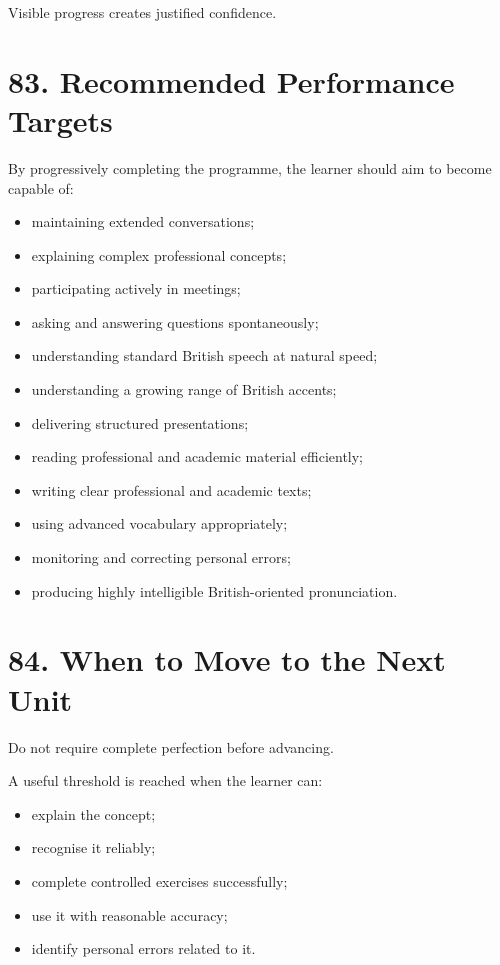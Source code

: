 Visible progress creates justified confidence.

\section*{83. Recommended Performance Targets}

By progressively completing the programme, the learner should aim to become capable of:

\begin{itemize}
    \item maintaining extended conversations;
    \item explaining complex professional concepts;
    \item participating actively in meetings;
    \item asking and answering questions spontaneously;
    \item understanding standard British speech at natural speed;
    \item understanding a growing range of British accents;
    \item delivering structured presentations;
    \item reading professional and academic material efficiently;
    \item writing clear professional and academic texts;
    \item using advanced vocabulary appropriately;
    \item monitoring and correcting personal errors;
    \item producing highly intelligible British-oriented pronunciation.
\end{itemize}

\section*{84. When to Move to the Next Unit}

Do not require complete perfection before advancing.

A useful threshold is reached when the learner can:

\begin{itemize}
    \item explain the concept;
    \item recognise it reliably;
    \item complete controlled exercises successfully;
    \item use it with reasonable accuracy;
    \item identify personal errors related to it.
\end{itemize}


